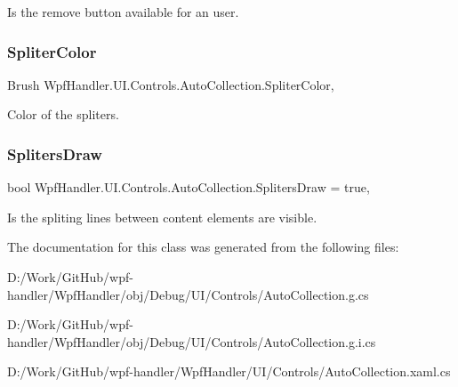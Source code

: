 Is the remove button available for an user. 

\mbox{\label{class_wpf_handler_1_1_u_i_1_1_controls_1_1_auto_collection_a9234690dcc653145332286c86afa4904}} 
\subsubsection{\texorpdfstring{Spliter\+Color}{SpliterColor}}
{\footnotesize\ttfamily Brush Wpf\+Handler.\+U\+I.\+Controls.\+Auto\+Collection.\+Spliter\+Color\hspace{0.3cm}{\ttfamily [get]}, {\ttfamily [set]}}



Color of the spliters. 

\mbox{\label{class_wpf_handler_1_1_u_i_1_1_controls_1_1_auto_collection_a78b75144a4f57f1ec4d6027388afbd5d}} 
\subsubsection{\texorpdfstring{Spliters\+Draw}{SplitersDraw}}
{\footnotesize\ttfamily bool Wpf\+Handler.\+U\+I.\+Controls.\+Auto\+Collection.\+Spliters\+Draw = true\hspace{0.3cm}{\ttfamily [get]}, {\ttfamily [set]}}



Is the spliting lines between content elements are visible. 



The documentation for this class was generated from the following files\+:\begin{DoxyCompactItemize}
\item 
D\+:/\+Work/\+Git\+Hub/wpf-\/handler/\+Wpf\+Handler/obj/\+Debug/\+U\+I/\+Controls/Auto\+Collection.\+g.\+cs\item 
D\+:/\+Work/\+Git\+Hub/wpf-\/handler/\+Wpf\+Handler/obj/\+Debug/\+U\+I/\+Controls/Auto\+Collection.\+g.\+i.\+cs\item 
D\+:/\+Work/\+Git\+Hub/wpf-\/handler/\+Wpf\+Handler/\+U\+I/\+Controls/Auto\+Collection.\+xaml.\+cs\end{DoxyCompactItemize}
